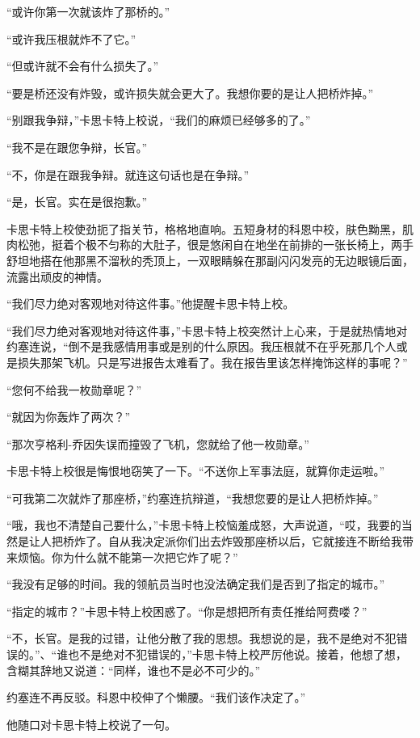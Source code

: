     “或许你第一次就该炸了那桥的。”

    “或许我压根就炸不了它。”

    “但或许就不会有什么损失了。”

    “要是桥还没有炸毁，或许损失就会更大了。我想你要的是让人把桥炸掉。”

    “别跟我争辩，”卡思卡特上校说，“我们的麻烦已经够多的了。”

    “我不是在跟您争辩，长官。”

    “不，你是在跟我争辩。就连这句话也是在争辩。”

    “是，长官。实在是很抱歉。”

    卡思卡特上校使劲扼了指关节，格格地直响。五短身材的科恩中校，肤色黝黑，肌肉松弛，挺着个极不匀称的大肚子，很是悠闲自在地坐在前排的一张长椅上，两手舒坦地搭在他那黑不溜秋的秃顶上，一双眼睛躲在那副闪闪发亮的无边眼镜后面，流露出顽皮的神情。

    “我们尽力绝对客观地对待这件事。”他提醒卡思卡特上校。

    “我们尽力绝对客观地对待这件事，”卡思卡特上校突然计上心来，于是就热情地对约塞连说，“倒不是我感情用事或是别的什么原因。我压根就不在乎死那几个人或是损失那架飞机。只是写进报告太难看了。我在报告里该怎样掩饰这样的事呢？”

    “您何不给我一枚勋章呢？”

    “就因为你轰炸了两次？”

    “那次亨格利-乔因失误而撞毁了飞机，您就给了他一枚勋章。”

    卡思卡特上校很是悔恨地窃笑了一下。“不送你上军事法庭，就算你走运啦。”

    “可我第二次就炸了那座桥，”约塞连抗辩道，“我想您要的是让人把桥炸掉。”

    “哦，我也不清楚自己要什么，”卡思卡特上校恼羞成怒，大声说道，“哎，我要的当然是让人把桥炸了。自从我决定派你们出去炸毁那座桥以后，它就接连不断给我带来烦恼。你为什么就不能第一次把它炸了呢？”

    “我没有足够的时间。我的领航员当时也没法确定我们是否到了指定的城市。”

    “指定的城市？”卡思卡特上校困惑了。“你是想把所有责任推给阿费喽？”

    “不，长官。是我的过错，让他分散了我的思想。我想说的是，我不是绝对不犯错误的。”、“谁也不是绝对不犯错误的，”卡思卡特上校严厉他说。接着，他想了想，含糊其辞地又说道：“同样，谁也不是必不可少的。”

    约塞连不再反驳。科恩中校伸了个懒腰。“我们该作决定了。”

    他随口对卡思卡特上校说了一句。

